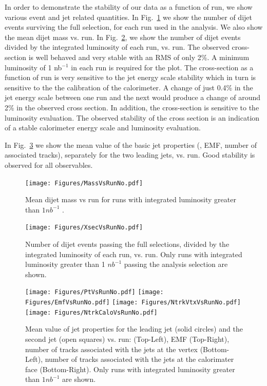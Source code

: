 In order to demonstrate the stability of our data as a function of run, we show various event
and jet related quantities. In Fig.~\ref{MassVsRun} we show the number of dijet events surviving 
the full selection, for each run used in the analysis. We also show the mean dijet mass vs. run. 
In Fig.~\ref{XsecVsRun}, we show the number of dijet events divided by the integrated luminosity
of each run, vs. run. The observed cross-section is well behaved and very stable with an RMS of 
only 2\%.
A minimum
luminosity of 1 nb$^{-1}$ in each 
run is required for the plot. The cross-section as a function of run is  very 
sensitive to the jet energy scale stability which in turn is sensitive to the 
the calibration of the calorimeter. A change of just 0.4\% in the jet energy scale between
one run and the next would produce a change of around 2\% in the observed cross
section.  In addition, the cross-section is sensitive to the luminosity 
evaluation.  The observed stability of the cross section is an indication of a stable calorimeter energy 
scale and luminosity evaluation.

In Fig.~\ref{JetPropertiesVsRun} we show the mean value of the basic jet properties (\pt, EMF, number of
associated tracks), separately for the two leading jets, vs. run. Good stability is observed for all observables.

\begin{figure}[!ht]
  \begin{center}
\texttt{[image: Figures/MassVsRunNo.pdf]} 
\caption{Mean dijet mass vs run for runs with integrated luminosity greater than $1 nb^{-1}$ .}
    \label{MassVsRun}
  \end{center}
\end{figure}

\begin{figure}[!ht]
  \begin{center}
\texttt{[image: Figures/XsecVsRunNo.pdf]}
\caption{Number of dijet events passing the full selections, divided by the integrated luminosity of each run, vs. run.
Only runs with integrated luminosity greater than 1 $nb^{-1}$ passing the analysis selection are shown.}
    \label{XsecVsRun}
  \end{center}
\end{figure}

\begin{figure}[!ht]
  \begin{center}
\texttt{[image: Figures/PtVsRunNo.pdf]}
\texttt{[image: Figures/EmfVsRunNo.pdf]}
\texttt{[image: Figures/NtrkVtxVsRunNo.pdf]}
\texttt{[image: Figures/NtrkCaloVsRunNo.pdf]}
\caption{Mean value of jet properties for the leading jet (solid circles) and the second jet (open squares) vs. run: 
\pt (Top-Left), EMF (Top-Right), number of tracks associated with the jets at the vertex (Bottom-Left), number of tracks associated with the jets at the calorimater face (Bottom-Right). Only runs with integrated luminosity greater than $1 nb^{-1}$ are shown.}
    \label{JetPropertiesVsRun}
  \end{center}
\end{figure}

